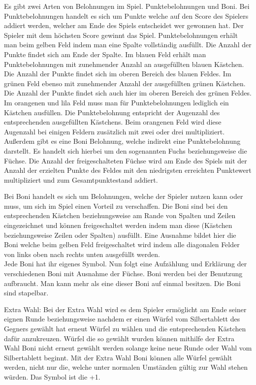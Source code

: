 Es gibt zwei Arten von Belohnungen im Spiel. Punktebelohnungen und Boni. Bei Punktebelohnungen handelt es sich um Punkte welche auf den Score des Spielers addiert werden, welcher am Ende des Spiels entscheidet wer gewonnen hat. Der Spieler mit dem höchsten Score gewinnt das Spiel. Punktebelohnungen erhält man beim gelben Feld indem man eine Spalte vollständig ausfüllt. Die Anzahl der Punkte findet sich am Ende der Spalte. Im blauen Feld erhält man Punktebelohnungen mit zunehmender Anzahl an ausgefüllten blauen Kästchen. Die Anzahl der Punkte findet sich im oberen Bereich des blauen Feldes. Im grünen Feld ebenso mit zunehmender Anzahl der ausgefüllten grünen Kästchen. Die Anzahl der Punkte findet sich auch hier im oberen Bereich des grünen Feldes. Im orangenen und lila Feld muss man für Punktebelohnungen lediglich ein Kästchen ausfüllen. Die Punktebelohnung entspricht der Augenzahl des entsprechenden ausgefüllten Kästchens. Beim orangenen Feld wird diese Augenzahl bei einigen Feldern zusätzlich mit zwei oder drei multipliziert. Außerdem gibt es eine Boni Belohnung, welche indirekt eine Punktebelohnung darstellt. Es handelt sich hierbei um den sogenannten Fuchs beziehungsweise die Füchse. Die Anzahl der freigeschalteten Füchse wird am Ende des Spiels mit der Anzahl der erzielten Punkte des Feldes mit den niedrigsten erreichten Punktewert multipliziert und zum Gesamtpunktestand addiert.

Bei Boni handelt es sich um Belohnungen, welche der Spieler nutzen kann oder muss, um sich im Spiel einen Vorteil zu verschaffen. Die Boni sind bei den entsprechenden Kästchen beziehungsweise am Rande von Spalten und Zeilen eingezeichnet und können freigeschaltet werden indem man diese (Kästchen beziehungsweise Zeilen oder Spalten) ausfüllt. Eine Ausnahme bildet hier die Boni welche beim gelben Feld freigeschaltet wird indem alle diagonalen Felder von links oben nach rechts unten ausgefüllt werden. \\

Jede Boni hat ihr eigenes Symbol. Nun folgt eine Aufzählung und Erklärung der verschiedenen Boni mit Ausnahme der Füchse. Boni werden bei der Benutzung aufbraucht. Man kann mehr als eine dieser Boni auf einmal besitzen. Die Boni sind stapelbar.

Extra Wahl: Bei der Extra Wahl wird es dem Spieler ermöglicht am Ende seiner eignen Runde beziehungsweise nachdem er einen Würfel vom Silbertablett des Gegners gewählt hat erneut Würfel zu wählen und die entsprechenden Kästchen dafür anzukreuzen. Würfel die so gewählt wurden können mithilfe der Extra Wahl Boni nicht erneut gewählt werden solange keine neue Runde oder Wahl vom Silbertablett beginnt. Mit der Extra Wahl Boni können alle Würfel gewählt werden, nicht nur die, welche unter normalen Umständen gültig zur Wahl stehen würden. Das Symbol ist die +1.

